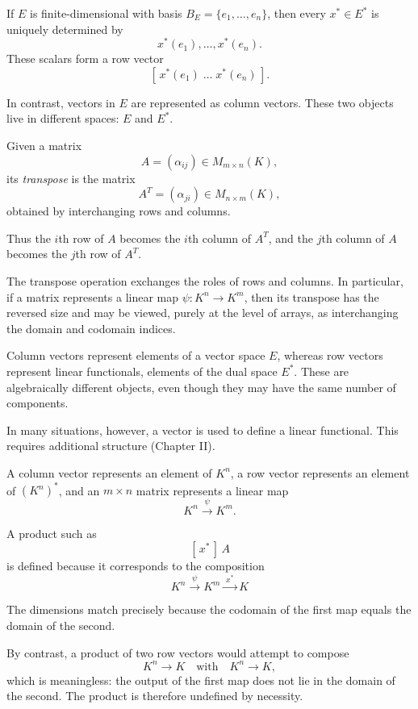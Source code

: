 If $E$ is finite-dimensional with basis $B_E=\{e_1,\dots,e_n\}$, then every $x^*\in E^*$ is uniquely determined by
\[
x^*(e_1),\dots,x^*(e_n).
\]
These scalars form a row vector
\[
[\,x^*(e_1)\;\dots\;x^*(e_n)\,].
\]

In contrast, vectors in $E$ are represented as column vectors. These two objects live in different spaces: $E$ and $E^*$.

\medskip

Given a matrix
\[
A = (\alpha_{ij}) \in M_{m \times n}(K),
\]
its \emph{transpose} is the matrix
\[
A^T = (\alpha_{ji}) \in M_{n \times m}(K),
\]
obtained by interchanging rows and columns.

\medskip

Thus the $i$th row of $A$ becomes the $i$th column of $A^T$,
and the $j$th column of $A$ becomes the $j$th row of $A^T$.

\medskip

The transpose operation exchanges the roles of rows and columns.
In particular, if a matrix represents a linear map
\( \psi : K^n \to K^m \),
then its transpose has the reversed size and may be viewed,
purely at the level of arrays, as interchanging the domain and codomain indices.

Column vectors represent elements of a vector space $E$, whereas row vectors represent linear functionals, elements of the dual space $E^*$. These are algebraically different objects, even though they may have the same number of components.

\medskip

In many situations, however, a vector is used to define a linear functional. This requires additional structure (Chapter II).

A column vector represents an element of $K^n$, a row vector represents an element of $(K^n)^*$, and an $m\times n$ matrix represents a linear map
\[
K^n \xrightarrow{\;\psi\;} K^m.
\]

A product such as
\[
[\,x^*\,]\,A
\]
is defined because it corresponds to the composition
\[
K^n \xrightarrow{\;\psi\;} K^m \xrightarrow{\;x^*\;} K
\]

The dimensions match precisely because the codomain of the first map equals the domain of the second.

\medskip

By contrast, a product of two row vectors would attempt to compose
\[
K^n \to K
\quad\text{with}\quad
K^n \to K,
\]
which is meaningless: the output of the first map does not lie in the domain of the second. The product is therefore undefined by necessity.

